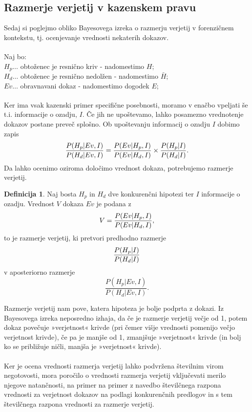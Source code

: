 \documentclass[12pt,a4paper]{amsart}
\theoremstyle{definition} %
\newtheorem{definicija}{Definicija}[section]
\theoremstyle{plain} %
\begin{document}
\subsection{Razmerje verjetij v kazenskem pravu}
Sedaj si poglejmo obliko Bayesovega izreka o razmerju verjetij v forenzičnem kontekstu, tj. ocenjevanje vrednosti nekaterih dokazov.\\\\
Naj bo:\\
$H_p \dots$ obtoženec je resnično kriv - nadomestimo $H$;\\
$H_d \dots$ obtoženec je resnično nedolžen - nadomestimo $\bar{H}$;\\
$Ev \dots$ obravnavani dokaz - nadomestimo dogodek $E$;\\\\
Ker ima vsak kazenski primer specifične posebnosti, moramo v enačbo vpeljati še t.i. informacije o ozadju, $I$. Če jih ne upoštevamo, lahko posamezno 
vrednotenje dokazov postane preveč splošno. Ob upoštevanju informacij o ozadju $I$ dobimo zapis
\[
   \frac{P(H_p \lvert Ev, I)}{P(H_d \lvert Ev, I)} = \frac{P(Ev \lvert H_p, I)}{P(Ev \lvert H_d, I)} \times \frac{P(H_p \lvert I)}{P(H_d \lvert I)}. \vspace{2mm}
\]
Da lahko ocenimo oziroma določimo vrednost dokaza, potrebujemo razmerje verjetij.
\begin{definicija}
    Naj bosta  $H_p$ in $H_d$ dve konkurenčni hipotezi ter $I$ informacije o ozadju. Vrednost $V$ dokaza $Ev$ je podana z
    \[
        V = \frac{P(Ev \lvert H_p, I)}{P(Ev \lvert H_d, I)}, \vspace{2mm}
    \]
    to je razmerje verjetij, ki pretvori predhodno razmerje
    \[
        \frac{P(H_p \lvert I)}{P(H_d \lvert I)} \vspace{2mm}
    \]
    v aposteriorno razmerje
    \[
        \frac{P(H_p \lvert Ev, I)}{P(H_d \lvert Ev, I)}.
    \]
\end{definicija}
Razmerje verjetij nam pove, katera hipoteza je bolje podprta z dokazi. Iz Bayesovega izreka neposredno izhaja, da če je razmerje verjetij večje od 1, potem dokaz povečuje
»verjetnost« krivde (pri čemer višje vrednosti pomenijo večjo verjetnost krivde), če pa je manjše od 1, zmanjšuje »verjetnost« krivde
(in bolj ko se približuje ničli, manjša je »verjetnost« krivde).\\\\
Ker je ocena vrednosti razmerja verjetij lahko podvržena številnim virom negotovosti, mora poročilo o vrednosti razmerja verjetij vključevati merilo 
njegove natančnosti, na primer  na primer z navedbo številčnega razpona vrednosti za verjetnost dokazov na podlagi konkurenčnih predlogov in s tem 
številčnega razpona vrednosti za razmerje verjetij.
\end{document}
